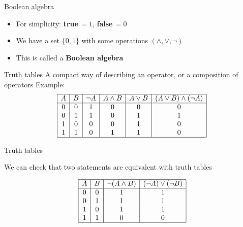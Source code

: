 \documentclass[11pt]{beamer}
\theoremstyle{definition}
\begin{document}

\begin{frame}{Boolean algebra}
  \begin{itemize}
    \item For simplicity: \textbf{true}\,$=1$, \textbf{false}\,$=0$
    \pause \item We have a set $\{0,1\}$ with some operations
                 $(\land,\lor,\neg)$
    \pause \item This is called a \textbf{Boolean algebra}
  \end{itemize}
\end{frame}


\begin{frame}{Truth tables}
  A compact way of describing an operator, or a composition of operators
  \pause
  \vspace{4pt}
  Example:
\begin{align*}
  \begin{array}{|c|c|c|c|c|c|}
    \hline
    A & B & \neg A & A\land B & A\lor B & (A\lor B)\land (\neg A)  \\
    \hline
    0 & 0 & 1 & 0 & 0 & 0 \\
    0 & 1 & 1 & 0 & 1 & 1 \\
    1 & 0 & 0 & 0 & 1 & 0 \\
    1 & 1 & 0 & 1 & 1 & 0 \\
    \hline
  \end{array}
\end{align*}
\end{frame}

\begin{frame}{Truth tables}
  \begin{center}
    We can check that two statements are equivalent with truth tables
  \end{center}
\begin{align*}
  \begin{array}{|c|c|c|c|}
    \hline
    A & B & \neg(A\land B) & (\neg A)\lor (\neg B)\\
    \hline
    0 & 0 & 1 & 1 \\
    0 & 1 & 1 & 1 \\
    1 & 0 & 1 & 1 \\
    1 & 1 & 0 & 0 \\
    \hline
  \end{array}
\end{align*}
\end{frame}
\end{document}
